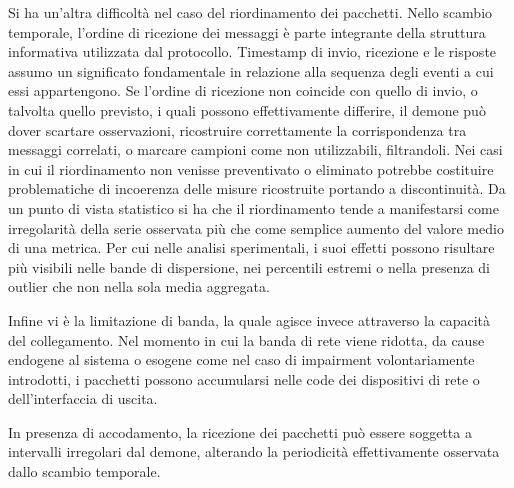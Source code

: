 Si ha un'altra difficoltà nel caso del riordinamento dei pacchetti. Nello scambio temporale,
l'ordine di ricezione dei messaggi è parte integrante della struttura
informativa utilizzata dal protocollo. Timestamp di invio, ricezione e le
risposte assumo un significato fondamentale in relazione alla sequenza degli
eventi a cui essi appartengono. Se l'ordine di ricezione non coincide con quello di
invio, o talvolta quello previsto, i quali possono effettivamente differire, il
demone può dover scartare osservazioni, ricostruire correttamente la corrispondenza
tra messaggi correlati, o marcare campioni come non utilizzabili, filtrandoli.
Nei casi in cui il riordinamento non venisse preventivato o eliminato potrebbe
costituire problematiche di incoerenza delle misure ricostruite portando a discontinuità.
Da un punto di vista statistico si ha che il riordinamento tende a manifestarsi come irregolarità
della serie osservata più che come semplice aumento del valore medio di una metrica.
Per cui nelle analisi sperimentali, i suoi effetti possono risultare
più visibili nelle bande di dispersione, nei percentili estremi o nella presenza di
outlier che non nella sola media aggregata.

Infine vi è la limitazione di banda, la quale agisce invece attraverso la
capacità del collegamento. Nel momento in cui la banda di rete viene ridotta, da
cause endogene al sistema o esogene come nel caso di impairment volontariamente
introdotti, i pacchetti possono accumularsi nelle code dei dispositivi di rete o dell'interfaccia
di uscita.

In presenza di accodamento, la ricezione dei pacchetti può essere soggetta a intervalli
irregolari dal demone, alterando la periodicità effettivamente osservata dallo
scambio temporale.